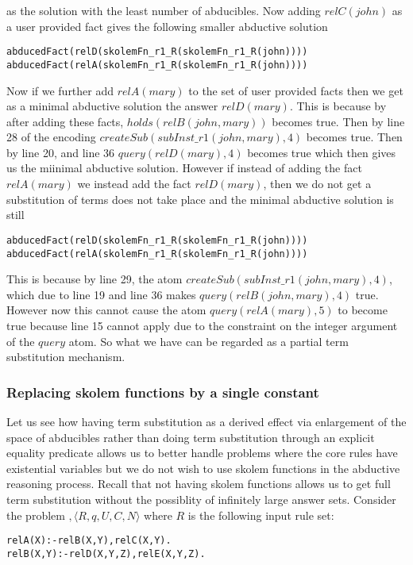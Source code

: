 \documentclass[sigconf]{acmart}
\begin{document}
as the solution with the least number of abducibles.
Now adding $relC(john)$ as a user provided fact gives the following smaller abductive solution
\begin{verbatim}
abducedFact(relD(skolemFn_r1_R(skolemFn_r1_R(john))))
abducedFact(relA(skolemFn_r1_R(skolemFn_r1_R(john))))    
\end{verbatim}
Now if we further add $relA(mary)$ to the set of user provided facts then we
get as a minimal abductive solution the answer $relD(mary)$. This is because
by after adding these facts, $holds(relB(john,mary))$ becomes true. Then by
line 28 of the encoding   $createSub(subInst\_r1(john,mary),4)$ becomes
true. Then by line 20, and line 36 $query(relD(mary),4)$ becomes true which
then gives us the miinimal abductive solution. However if instead of adding
the fact $relA(mary)$ we instead add the fact $relD(mary)$, then we do not get
a  substitution of terms does not take place and the minimal abductive
solution is still
\begin{verbatim}
abducedFact(relD(skolemFn_r1_R(skolemFn_r1_R(john))))
abducedFact(relA(skolemFn_r1_R(skolemFn_r1_R(john))))    
\end{verbatim} 
This is because by line 29, the atom $createSub(subInst\_r1(john,mary),4)$,
which due to line 19 and line 36 makes $query(relB(john,mary),4)$
true. However now this cannot cause the atom $query(relA(mary),5)$ to become
true because line 15 cannot apply due to the constraint on the integer
argument of the $query$ atom. So what we have can be regarded as a partial
term substitution mechanism.


\subsubsection{Replacing skolem functions by a single constant}

Let us see how having term substitution as a derived effect via enlargement of
the space of abducibles rather than doing term substitution through an
explicit equality predicate allows us to better handle problems where the core
rules have existential variables but we do not wish to use skolem functions in
the abductive reasoning process. Recall that not having skolem functions
allows us to get full term substitution without the possiblity of infinitely
large answer sets. Consider the problem $,\langle R,q,U,C,N \rangle$ where $R$ is the
following input rule set: 

\begin{verbatim}
relA(X):-relB(X,Y),relC(X,Y).
relB(X,Y):-relD(X,Y,Z),relE(X,Y,Z).
\end{verbatim}
\end{document}
